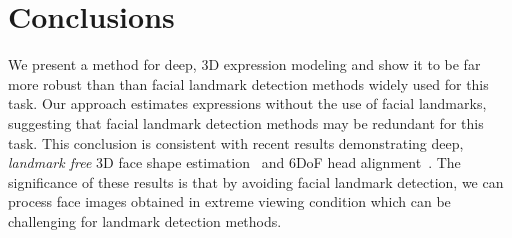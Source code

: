 \documentclass[a4paper, 10pt, conference]{ieeeconf}
\begin{document}
\section{Conclusions}\label{sec:conclu}
We present a method for deep, 3D expression modeling and show it to be far more robust than than facial landmark detection methods widely used for this task. Our approach estimates expressions without the use of facial landmarks, suggesting that facial landmark detection methods may be redundant for this task. This conclusion is consistent with recent results demonstrating deep, {\em landmark free} 3D face shape estimation~\cite{chang17fpn} and 6DoF head alignment~\cite{tran16_3dmm_cnn}. The significance of these results is that by avoiding facial landmark detection, we can process face images obtained in extreme viewing condition which can be challenging for landmark detection methods.

\end{document}
